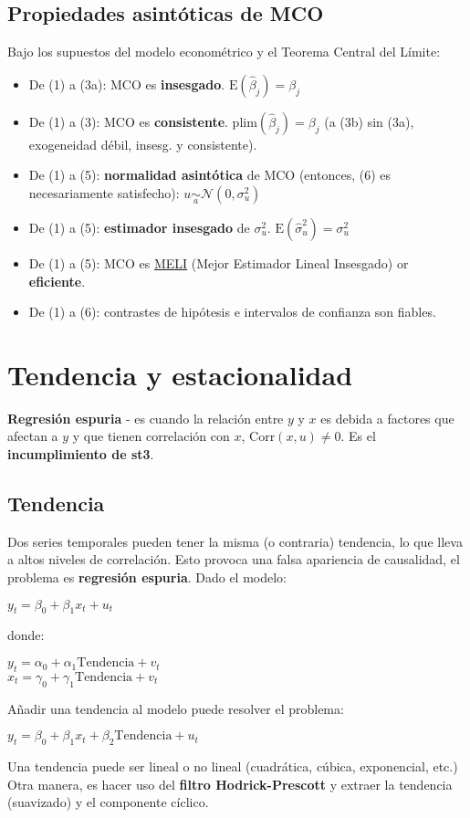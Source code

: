 \documentclass[10pt, a4paper, landscape]{extarticle}
\newcommand{\E}{\mathrm{E}}
\newcommand{\Corr}{\mathrm{Corr}}
\begin{document}
\begin{multicols}{3}
	\subsection*{Propiedades asintóticas de MCO}
		Bajo los supuestos del modelo econométrico y el Teorema Central del Límite:
		\begin{itemize}[leftmargin=*]
			\item De (1) a (3a): MCO es \textbf{insesgado}. $\E(\hat{\beta}_j) = \beta_j$
			\item De (1) a (3): MCO es \textbf{consistente}. $\mathrm{plim}(\hat{\beta}_j) = \beta_j$ (a (3b) sin (3a), exogeneidad débil, insesg. y consistente).
			\item De (1) a (5): \textbf{normalidad asintótica} de MCO (entonces, (6) es necesariamente satisfecho): $u \underset{a}{\sim} \mathcal{N}(0,\sigma^2_u)$
			\item De (1) a (5): \textbf{estimador insesgado} de $\sigma^2_u$. $\E(\hat{\sigma}^2_u) = \sigma^2_u$
			\item De (1) a (5): MCO es \textcolor{blue}{\href{https://www.youtube.com/watch?v=68ugkg9RePc}{MELI}} (Mejor Estimador Lineal Insesgado) or \textbf{eficiente}. 
			\item De (1) a (6): contrastes de hipótesis e intervalos de confianza son fiables.
		\end{itemize}
\columnbreak
\section*{Tendencia y estacionalidad}
	\textbf{Regresión espuria} - es cuando la relación entre $y$ y $x$ es debida a factores que afectan a $y$ y que tienen correlación con $x$, $\Corr(x, u) \neq 0$. Es el  \textbf{incumplimiento de st3}.
	\subsection*{Tendencia}
		Dos series temporales pueden tener la misma (o contraria) tendencia, lo que lleva a altos niveles de correlación. Esto provoca una falsa apariencia de causalidad, el problema es \textbf{regresión espuria}. Dado el modelo:
		\begin{center}
			$y_t = \beta_0 + \beta_1 x_t + u_t$
		\end{center}
		donde:
		\begin{center}
			$y_t = \alpha_0 + \alpha_1 \mathrm{Tendencia} + v_t$ \\
			$x_t = \gamma_0 + \gamma_1 \mathrm{Tendencia} + v_t$
		\end{center}
		Añadir una tendencia al modelo puede resolver el problema:
		\begin{center}
			$y_t = \beta_0 + \beta_1 x_t + \beta_2 \mathrm{Tendencia} + u_t$
		\end{center}
		Una tendencia puede ser lineal o no lineal (cuadrática, cúbica, exponencial, etc.) \\
		Otra manera, es hacer uso del \textbf{filtro Hodrick-Prescott} y extraer la tendencia (suavizado) y el componente cíclico.

\end{multicols}
\end{document}

